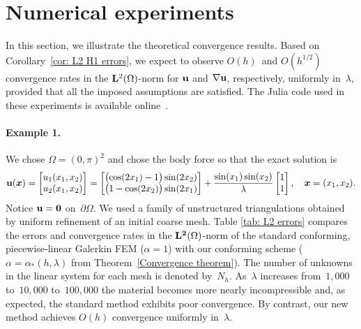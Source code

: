 \documentclass[11pt]{article}
\newcommand{\vu}{{\bf u}}
\newcommand{\bsx}{{\boldsymbol{x}}}
\numberwithin{equation}{section}
\begin{document}
\section{Numerical experiments}\label{Sec: Numeric}
In this section, we illustrate the theoretical convergence results. Based on 
Corollary~\ref{cor: L2 H1 errors}, we expect to observe $O(h)$~and $O(h^{1/2})$ convergence rates 
in the ${\bf L}^2(\Omega)$-norm for ${\bf u}$ and $\nabla {\bf u}$, 
respectively, uniformly in~$\lambda$, 
provided that all the imposed assumptions are  satisfied.   The Julia code used in these experiments is available online~\cite{McLean2024}.

\paragraph{Example 1.} We chose  $\Omega=(0,\pi)^2$ and chose the body force so that the exact solution is
\[\vu(\boldsymbol{x})=\begin{bmatrix}  u_1(x_1,x_2)\\  u_2(x_1,x_2)\end{bmatrix}
=\begin{bmatrix} \bigl(\cos(2x_1)-1\bigr)\sin(2x_2)\\ \bigl(1-\cos(2x_2)\bigr)\sin(2x_1)
\end{bmatrix} +\frac{\sin(x_1)\sin(x_2)}{\lambda}\begin{bmatrix}1\\ 1\end{bmatrix},\quad \bsx=(x_1,x_2).\] 
Notice $\vu=\mathbf{0}$ on~$\partial\Omega$.  We used a family of unstructured triangulations obtained by
uniform refinement of an initial coarse mesh.   Table \ref{tab: L2 errors} compares  the errors and
convergence rates in the ${\bf L^2}(\Omega)$-norm of the standard conforming, piecewise-linear Galerkin FEM ($\alpha=1$) with our  conforming scheme ($\alpha=\alpha_*(h,\lambda)$ from Theorem~\ref{Convergence theorem}).  The number of unknowns in the 
linear system for each mesh is denoted by~$N_h$.  As~$\lambda$ increases from~$1{,}000$ to~$10{,}000$ 
to~$100{,}000$ the material becomes more nearly incompressible and, as expected, the standard 
method exhibits poor convergence. By contrast, our new method achieves $O(h)$ convergence uniformly 
in~$\lambda$.
   
\end{document}
